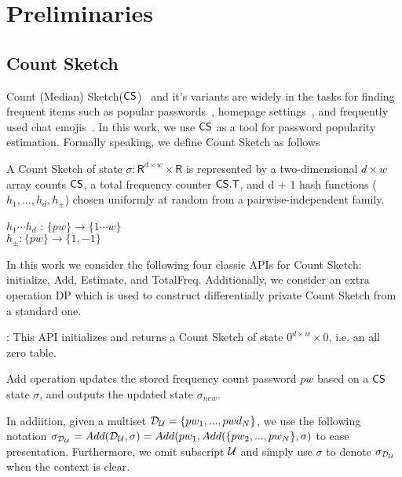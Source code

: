 
\section{Preliminaries} \label{section:Prelinmaries}

\subsection{Count Sketch}\label{section:Prelinmaries-CountSketch} %
%
Count (Median) Sketch($\mathsf{CS}$)~\cite{ICALP:ChaCheFar02} and it's variants are widely in the tasks for finding frequent items such as popular passwords~\cite{CCS:NaoPinRon19}, homepage settings~\cite{CCS:ErlPihKor14}, and frequently used chat emojis~\cite{AppleDP}. In this work, we use $\mathsf{CS}$ as a tool for password popularity estimation. Formally speaking, we define Count Sketch as follows

\begin{definition}
	A Count Sketch of state $\sigma: \mathsf{R}^{d\times w} \times \mathsf{R}$ is represented by a two-dimensional $d\times w$ array counts $\mathsf{CS}$, a total frequency counter $\mathsf{CS.T}$, and d + 1 hash functions ($h_1, \ldots, h_d, h_{\pm}$) chosen uniformly at random from a pairwise-independent family. 
	\begin{center}
		$h_1 \cdots h_d$ : $\{pw\} \rightarrow \{1\cdots w\}$\\
		$h_{\pm} : \{pw\} \rightarrow \{1, -1\}$\\
	\end{center}
\end{definition}

In this work we consider the following four classic APIs for Count Sketch: initialize, Add, Estimate, and TotalFreq. Additionally, we consider an extra operation DP which is used to construct differentially private Count Sketch from a standard one.

: This API initializes and returns a Count Sketch of state $0^{d\times w}\times 0$, i.e. an all zero table.

 Add operation updates the stored frequency count password $pw$ based on a $\mathsf{CS}$ state $\sigma$, and outputs the updated state $\sigma_{new}$.

In addiition, given a multiset $\mathcal{D}_{{\mathcal{U}}} = \{pw_1,...,pwd_N\}$, we use the following notation $\sigma_{\mathcal{D}_{{\mathcal{U}}}} =  Add(\mathcal{D}_{{\mathcal{U}}},\sigma) \\= Add(pw_1, Add(\{pw_2,...,pw_N\},\sigma)$ to ease presentation. Furthermore, we omit subscript $\mathcal{U}$ and simply use $\sigma$ to denote $\sigma_{\mathcal{D}_{{\mathcal{U}}}}$ when the context is clear.

